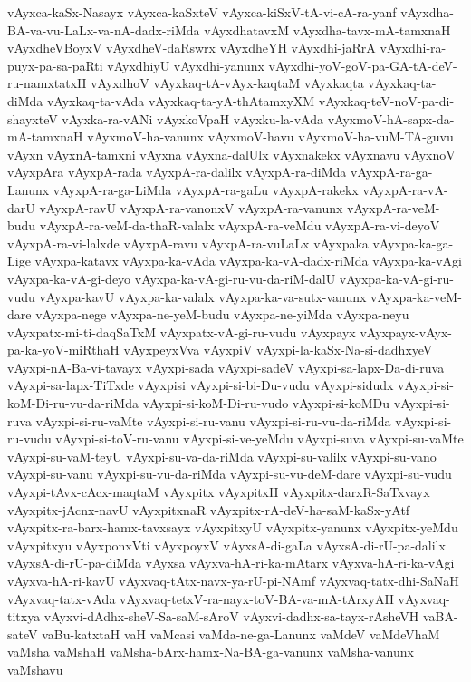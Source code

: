 {vAyxca-kaSx-Nasayx
vAyxca-kaSxteV
vAyxca-kiSxV-tA-vi-cA-ra-yanf
vAyxdha-BA-va-vu-LaLx-va-nA-dadx-riMda
vAyxdhatavxM
vAyxdha-tavx-mA-tamxnaH
vAyxdheVBoyxV
vAyxdheV-daRswrx
vAyxdheYH
vAyxdhi-jaRrA
vAyxdhi-ra-puyx-pa-sa-paRti
vAyxdhiyU
vAyxdhi-yanunx
vAyxdhi-yoV-goV-pa-GA-tA-deV-ru-namxtatxH
vAyxdhoV
vAyxkaq-tA-vAyx-kaqtaM
vAyxkaqta
vAyxkaq-ta-diMda
vAyxkaq-ta-vAda
vAyxkaq-ta-yA-thAtamxyXM
vAyxkaq-teV-noV-pa-di-shayxteV
vAyxka-ra-vANi
vAyxkoVpaH
vAyxku-la-vAda
vAyxmoV-hA-sapx-da-mA-tamxnaH
vAyxmoV-ha-vanunx
vAyxmoV-havu
vAyxmoV-ha-vuM-TA-guvu
vAyxn
vAyxnA-tamxni
vAyxna
vAyxna-dalUlx
vAyxnakekx
vAyxnavu
vAyxnoV
vAyxpAra
vAyxpA-rada
vAyxpA-ra-dalilx
vAyxpA-ra-diMda
vAyxpA-ra-ga-Lanunx
vAyxpA-ra-ga-LiMda
vAyxpA-ra-gaLu
vAyxpA-rakekx
vAyxpA-ra-vA-darU
vAyxpA-ravU
vAyxpA-ra-vanonxV
vAyxpA-ra-vanunx
vAyxpA-ra-veM-budu
vAyxpA-ra-veM-da-thaR-valalx
vAyxpA-ra-veMdu
vAyxpA-ra-vi-deyoV
vAyxpA-ra-vi-lalxde
vAyxpA-ravu
vAyxpA-ra-vuLaLx
vAyxpaka
vAyxpa-ka-ga-Lige
vAyxpa-katavx
vAyxpa-ka-vAda
vAyxpa-ka-vA-dadx-riMda
vAyxpa-ka-vAgi
vAyxpa-ka-vA-gi-deyo
vAyxpa-ka-vA-gi-ru-vu-da-riM-dalU
vAyxpa-ka-vA-gi-ru-vudu
vAyxpa-kavU
vAyxpa-ka-valalx
vAyxpa-ka-va-sutx-vanunx
vAyxpa-ka-veM-dare
vAyxpa-nege
vAyxpa-ne-yeM-budu
vAyxpa-ne-yiMda
vAyxpa-neyu
vAyxpatx-mi-ti-daqSaTxM
vAyxpatx-vA-gi-ru-vudu
vAyxpayx
vAyxpayx-vAyx-pa-ka-yoV-miRthaH
vAyxpeyxVva
vAyxpiV
vAyxpi-la-kaSx-Na-si-dadhxyeV
vAyxpi-nA-Ba-vi-tavayx
vAyxpi-sada
vAyxpi-sadeV
vAyxpi-sa-lapx-Da-di-ruva
vAyxpi-sa-lapx-TiTxde
vAyxpisi
vAyxpi-si-bi-Du-vudu
vAyxpi-sidudx
vAyxpi-si-koM-Di-ru-vu-da-riMda
vAyxpi-si-koM-Di-ru-vudo
vAyxpi-si-koMDu
vAyxpi-si-ruva
vAyxpi-si-ru-vaMte
vAyxpi-si-ru-vanu
vAyxpi-si-ru-vu-da-riMda
vAyxpi-si-ru-vudu
vAyxpi-si-toV-ru-vanu
vAyxpi-si-ve-yeMdu
vAyxpi-suva
vAyxpi-su-vaMte
vAyxpi-su-vaM-teyU
vAyxpi-su-va-da-riMda
vAyxpi-su-valilx
vAyxpi-su-vano
vAyxpi-su-vanu
vAyxpi-su-vu-da-riMda
vAyxpi-su-vu-deM-dare
vAyxpi-su-vudu
vAyxpi-tAvx-cAcx-maqtaM
vAyxpitx
vAyxpitxH
vAyxpitx-darxR-SaTxvayx
vAyxpitx-jAcnx-navU
vAyxpitxnaR
vAyxpitx-rA-deV-ha-saM-kaSx-yAtf
vAyxpitx-ra-barx-hamx-tavxsayx
vAyxpitxyU
vAyxpitx-yanunx
vAyxpitx-yeMdu
vAyxpitxyu
vAyxponxVti
vAyxpoyxV
vAyxsA-di-gaLa
vAyxsA-di-rU-pa-dalilx
vAyxsA-di-rU-pa-diMda
vAyxsa
vAyxva-hA-ri-ka-mAtarx
vAyxva-hA-ri-ka-vAgi
vAyxva-hA-ri-kavU
vAyxvaq-tAtx-navx-ya-rU-pi-NAmf
vAyxvaq-tatx-dhi-SaNaH
vAyxvaq-tatx-vAda
vAyxvaq-tetxV-ra-nayx-toV-BA-va-mA-tArxyAH
vAyxvaq-titxya
vAyxvi-dAdhx-sheV-Sa-saM-sAroV
vAyxvi-dadhx-sa-tayx-rAsheVH
vaBA-sateV
vaBu-katxtaH
vaH
vaMcasi
vaMda-ne-ga-Lanunx
vaMdeV
vaMdeVhaM
vaMsha
vaMshaH
vaMsha-bArx-hamx-Na-BA-ga-vanunx
vaMsha-vanunx
vaMshavu
}
